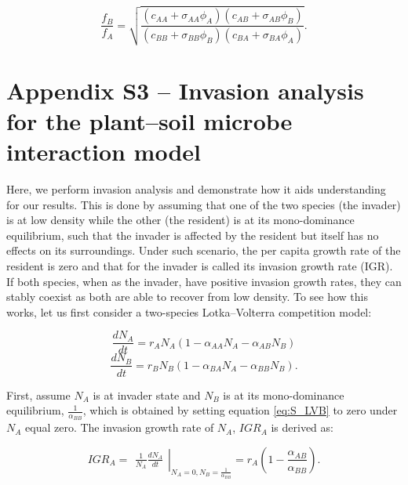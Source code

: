 \begin{equation}
\frac{f_{B}}{f_{A}} = \sqrt{\frac{\left ( c_{AA} + \sigma_{AA}\phi_{A} \right )
											    \left ( c_{AB} + \sigma_{AB}\phi_{B} \right )}
											   {\left ( c_{BB} + \sigma_{BB}\phi_{B} \right )
												\left ( c_{BA} + \sigma_{BA}\phi_{A} \right )}} .
\tag{S4.19}\label{eq:S_FR}
\end{equation}
\par



\section{Appendix S3 -- Invasion analysis for the plant--soil microbe interaction model}
Here, we perform invasion analysis and demonstrate how it aids understanding for our results. This is done by assuming that one of the two species (the invader) is at low density while the other (the resident) is at its mono-dominance equilibrium, such that the invader is affected by the resident but itself has no effects on its surroundings. Under such scenario, the per capita growth rate of the resident is zero and that for the invader is called its invasion growth rate (IGR). If both species, when as the invader, have positive invasion growth rates, they can stably coexist as both are able to recover from low density. To see how this works, let us first consider a two-species Lotka--Volterra competition model:

\begin{equation}
\frac{dN_{A}}{dt} = r_{A}N_{A}\left ( 1-\alpha_{AA}N_{A}-\alpha_{AB}N_{B} \right )
\tag{S4.20}\label{eq:S_LVA}
\end{equation}
\begin{equation}
\frac{dN_{B}}{dt} = r_{B}N_{B}\left ( 1-\alpha_{BA}N_{A}-\alpha_{BB}N_{B} \right ) .
\tag{S4.21}\label{eq:S_LVB}
\end{equation}

\noindent First, assume $N_{A}$ is at invader state and $N_{B}$ is at its mono-dominance equilibrium, $\frac{1}{\alpha_{BB}}$, which is obtained by setting equation \ref{eq:S_LVB} to zero under $N_{A}$ equal zero. The invasion growth rate of $N_{A}$, $IGR_{A}$ is derived as:

\begin{equation}
IGR_{A} =
\left.\begin{matrix}
\frac{1}{N_{A}}\frac{dN_{A}}{dt}
\end{matrix}\right|
_{N_{A}=0, N_{B}=\frac{1}{\alpha_{BB}}} = r_{A}\left( 1 - \frac{\alpha_{AB}}{\alpha_{BB}}\right) .
\tag{S4.22}\label{eq:S_IGR_A}
\end{equation}

